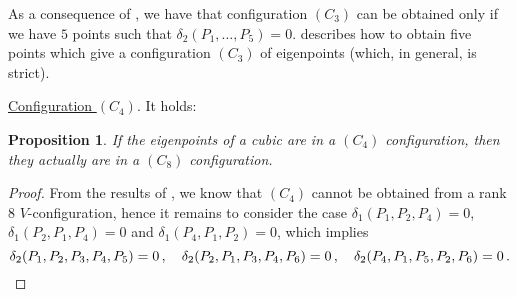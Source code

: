 \documentclass[a4paper, 11pt, reqno]{amsart}
\theoremstyle{plain}
\newtheorem{prop}[lemma]{Proposition}
\theoremstyle{definition}
\begin{document}
As a consequence of , we have that configuration $(C_3)$ can
be obtained only if we have $5$ points such that
$\delta_2(P_1, \dotsc, P_5) = 0$.  describes how to
obtain five points which give a configuration $(C_3)$ of eigenpoints (which, 
in general, is strict).

\underline{Configuration $(C_4)$}. It holds:
\begin{prop}
\label{conf4no} If the eigenpoints of a cubic are in a $(C_4)$ configuration, then they actually are in a $(C_8)$ configuration.
\end{prop}
\begin{proof}
From the results of , we know that $(C_4)$
cannot be obtained from a rank 8 $V$-configuration,
hence it remains to consider the case $\delta_1(P_1, P_2, P_4) = 0$,
$\delta_1(P_2, P_1, P_4) = 0$ and $\delta_1(P_4, P_1, P_2) = 0$,
which implies
%
\[
  \delta_2(P_1, P_2, P_3, P_4, P_5) = 0 \,, \quad
  \delta_2(P_2, P_1, P_3, P_4, P_6) = 0 \,, \quad
  \delta_2(P_4, P_1, P_5, P_2, P_6) = 0 \,. \qedhere
\]
%
\end{proof}
\end{document}
